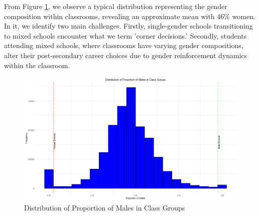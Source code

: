  
 
From Figure \ref{histograma_male_fraction}, we observe a typical distribution representing the gender composition within classrooms, revealing an approximate mean with 46\% women. In it, we identify two main challenges. Firstly, single-gender schools transitioning to mixed schools encounter what we term 'corner decisions.' Secondly, students attending mixed schools, where classrooms have varying gender compositions, alter their post-secondary career choices due to gender reinforcement dynamics within the classroom.


\begin{figure}[H] %
    \centering
    \includegraphics[width=0.7\linewidth]{Graph/his_frac_males.png} %
    \caption{Distribution of Proportion of Males in Class Groups}
    \label{histograma_male_fraction}
\end{figure}

